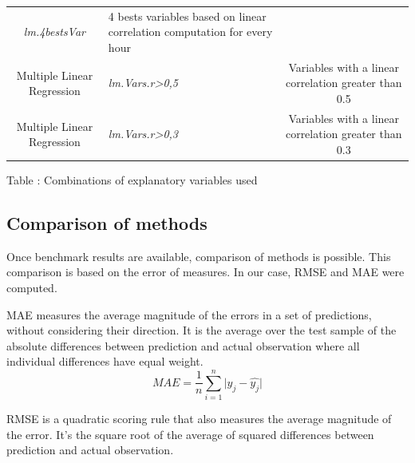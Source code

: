 \documentclass[12pt,twoside]{reedthesis}
\theoremstyle{definition}
\theoremstyle{definition}
\theoremstyle{definition}
\theoremstyle{remark}
\begin{document}
\begin{longtable}[]{@{}clc@{}}
\begin{minipage}[t]{0.21\columnwidth}
\emph{lm.4bestsVar}\strut
\end{minipage} & \begin{minipage}[t]{0.52\columnwidth}\centering\strut
4 bests variables based on linear correlation computation for every
hour\strut
\end{minipage}\tabularnewline
\begin{minipage}[t]{0.18\columnwidth}\centering\strut
Multiple Linear Regression\strut
\end{minipage} & \begin{minipage}[t]{0.21\columnwidth}\raggedright\strut
\emph{lm.Vars.r\textgreater{}0,5}\strut
\end{minipage} & \begin{minipage}[t]{0.52\columnwidth}\centering\strut
Variables with a linear correlation greater than 0.5\strut
\end{minipage}\tabularnewline
\begin{minipage}[t]{0.18\columnwidth}\centering\strut
Multiple Linear Regression\strut
\end{minipage} & \begin{minipage}[t]{0.21\columnwidth}\raggedright\strut
\emph{lm.Vars.r\textgreater{}0,3}\strut
\end{minipage} & \begin{minipage}[t]{0.52\columnwidth}\centering\strut
Variables with a linear correlation greater than 0.3\strut
\end{minipage}\tabularnewline
\bottomrule
\end{longtable}
Table : \label{tab:explvar} Combinations of explanatory variables used

\subsection{Comparison of methods}\label{comparison-of-methods}

Once benchmark results are available, comparison of methods is possible.
This comparison is based on the error of measures. In our case, RMSE and
MAE were computed.

MAE measures the average magnitude of the errors in a set of
predictions, without considering their direction. It is the average over
the test sample of the absolute differences between prediction and
actual observation where all individual differences have equal weight.
\[
MAE = \frac{1}{n} \sum_{i=1}^{n}{ \lvert y_{j} - \widehat{y_{j}} \rvert}
\]

RMSE is a quadratic scoring rule that also measures the average
magnitude of the error. It's the square root of the average of squared
differences between prediction and actual observation.
\end{document}
